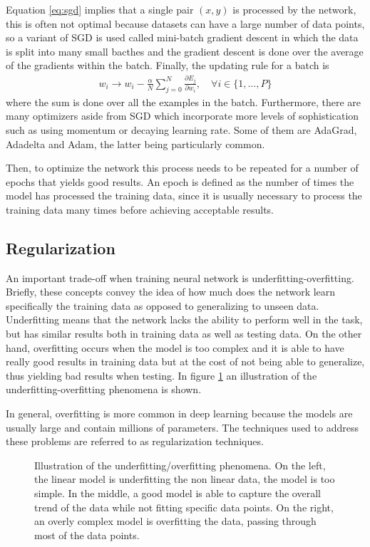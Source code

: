 Equation \eqref{eq:sgd} implies that a single pair $(x,y)$ is processed by the network, this is often not optimal because datasets can have a large number of data points, so a variant of SGD is used called mini-batch gradient descent in which the data is split into many small bacthes and the gradient descent is done over the average of the gradients within the batch. Finally, the updating rule for a batch is
\begin{align*}
    w_i \xrightarrow{} w_i - \frac{\alpha}{N} \sum_{j=0}^N\frac{\partial E_j}{\partial w_i},\quad \forall i \in \{1,\ldots, P\} 
\end{align*}
where the sum is done over all the examples in the batch. Furthermore, there are many optimizers aside from SGD which incorporate more levels of sophistication such as using momentum or decaying learning rate. Some of them are AdaGrad, Adadelta and Adam, the latter being particularly common.

Then, to optimize the network this process needs to be repeated for a number of epochs that yields good results. An epoch is defined as the number of times the model has processed the training data, since it is usually necessary to process the training data many times before achieving acceptable results.

\subsection{Regularization}

An important trade-off when training neural network is underfitting-overfitting. Briefly, these concepts convey the idea of how much does the network learn specifically the training data as opposed to generalizing to unseen data. Underfitting means that the network lacks the ability to perform well in the task, but has similar results both in training data as well as testing data. On the other hand, overfitting occurs when the model is too complex and it is able to have really good results in training data but at the cost of not being able to generalize, thus yielding bad results when testing. In figure \ref{fig:overfit} an illustration of the underfitting-overfitting phenomena is shown.

In general, overfitting is more common in deep learning because the models are usually large and contain millions of parameters. The techniques used to address these problems are referred to as regularization techniques.

\begin{figure}
    \centering
    \resizebox{\linewidth}{!}{
    
    }
    \caption[Illustration of the underfitting/overfitting phenomena]{Illustration of the underfitting/overfitting phenomena. On the left, the linear model is underfitting the non linear data, the model is too simple. In the middle, a good model is able to capture the overall trend of the data while not fitting specific data points. On the right, an overly complex model is overfitting the data, passing through most of the data points.}
   \label{fig:overfit}
\end{figure}

